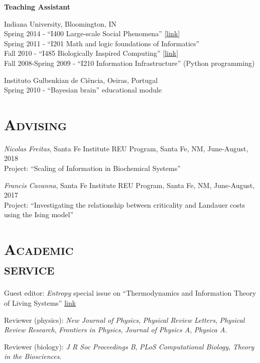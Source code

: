 \documentclass[margin,line,centered]{res}
\begin{document}
\begin{resume}
\textbf{Teaching Assistant}

Indiana University, Bloomington, IN\\
\hangindent=10pt Spring 2014 - ``I400 Large-scale Social Phenomena'' {[}\href{http://tuvalu.santafe.edu/~simon/page11/page11.html}{link}{]} \\
Spring 2011 - ``I201 Math and logic foundations of Informatics''\\
Fall 2010 - ``I485 Biologically Inspired Computing'' {[}\href{http://www.informatics.indiana.edu/rocha/i-bic/}{link}{]}\\
Fall 2008-Spring 2009 - ``I210 Information Infrastructure'' (Python programming)

Instituto Gulbenkian de Ciência, Oeiras, Portugal\\
\hangindent=10pt Spring 2010 - ``Bayesian brain'' educational module


\section{\textsc{Advising}}
\emph{Nicolas Freitas}, Santa Fe Institute REU Program, Santa Fe, NM, June-August, 2018 \\
Project: ``Scaling of Information in Biochemical Systems''

\emph{Francis Cavanna}, Santa Fe Institute REU Program, Santa Fe, NM, June-August, 2017 \\
Project: ``Investigating the relationship between criticality and Landauer costs using the Ising model''

\section{\textsc{Academic\\service}}

{Guest editor}: \emph{Entropy} special issue on ``Thermodynamics and Information Theory of Living Systems'' \href{https://www.mdpi.com/journal/entropy/special_issues/thermodynamics_living_systems}{link}

{Reviewer} (physics): \emph{New Journal of Physics}, \emph{Physical Review Letters}, \emph{Physical Review Research}, \emph{Frontiers in Physics}, \emph{Journal of Physics A}, \emph{Physica A}.

Reviewer (biology): \emph{J R Soc Proceedings B}, \emph{PLoS Computational Biology}, \emph{Theory in the Biosciences}.


\end{resume}
\end{document}
